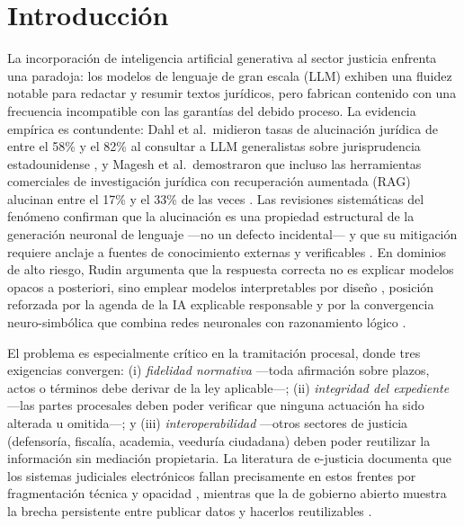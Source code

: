 \documentclass[computers,article,submit,pdftex,moreauthors]{Definitions/mdpi}
\begin{document}
\section{Introducción}
\label{sec:intro}

La incorporación de inteligencia artificial generativa al sector justicia enfrenta una paradoja: los modelos de lenguaje de gran escala (LLM) exhiben una fluidez notable para redactar y resumir textos jurídicos, pero fabrican contenido con una frecuencia incompatible con las garantías del debido proceso. La evidencia empírica es contundente: Dahl et al.\ midieron tasas de alucinación jurídica de entre el 58\% y el 82\% al consultar a LLM generalistas sobre jurisprudencia estadounidense \cite{Dahl2024}, y Magesh et al.\ demostraron que incluso las herramientas comerciales de investigación jurídica con recuperación aumentada (RAG) alucinan entre el 17\% y el 33\% de las veces \cite{Magesh2025}. Las revisiones sistemáticas del fenómeno confirman que la alucinación es una propiedad estructural de la generación neuronal de lenguaje ---no un defecto incidental--- y que su mitigación requiere anclaje a fuentes de conocimiento externas y verificables \cite{Ji2023,Huang2025}. En dominios de alto riesgo, Rudin argumenta que la respuesta correcta no es explicar modelos opacos a posteriori, sino emplear modelos interpretables por diseño \cite{Rudin2019}, posición reforzada por la agenda de la IA explicable responsable \cite{BarredoArrieta2020} y por la convergencia neuro-simbólica que combina redes neuronales con razonamiento lógico \cite{Sarker2021,Pan2024}.

El problema es especialmente crítico en la tramitación procesal, donde tres exigencias convergen: (i) \emph{fidelidad normativa} ---toda afirmación sobre plazos, actos o términos debe derivar de la ley aplicable---; (ii) \emph{integridad del expediente} ---las partes procesales deben poder verificar que ninguna actuación ha sido alterada u omitida---; y (iii) \emph{interoperabilidad} ---otros sectores de justicia (defensoría, fiscalía, academia, veeduría ciudadana) deben poder reutilizar la información sin mediación propietaria. La literatura de e-justicia documenta que los sistemas judiciales electrónicos fallan precisamente en estos frentes por fragmentación técnica y opacidad \cite{Rosa2013,Lupo2014}, mientras que la de gobierno abierto muestra la brecha persistente entre publicar datos y hacerlos reutilizables \cite{Janssen2012,Attard2015}.
\end{document}
